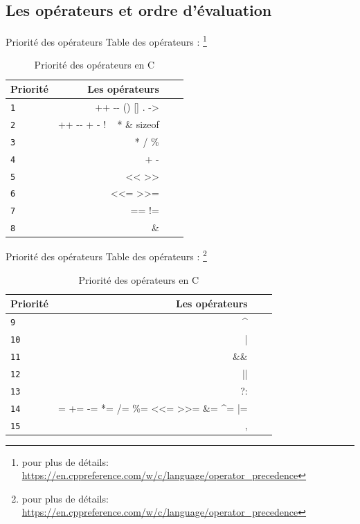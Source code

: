     
    \subsection{Les opérateurs et ordre d'évaluation}
    \begin{frame}{Priorité des opérateurs}
    	Table des opérateurs : \footnote[frame]{pour plus de détails: \url{https://en.cppreference.com/w/c/language/operator_precedence}}
  		\begin{table}[!b]
	  		{\carlitoTLF %
	  		\begin{tabularx}{\textwidth}{Xrrr}
	  			\textbf{Priorité} & \textbf{Les opérateurs} \\
	  			\toprule
	  			\texttt{1} & ++ -{}- () [] . ->    			\\
	  			\texttt{2} & ++ -{}- + - ! ~ * \& sizeof    \\
	  			\texttt{3} & * / \%  						\\
	  			\texttt{4} & + -							\\
	  			\texttt{5} & <{}< >{}>						\\
	  			\texttt{6} & <{}<= >{}>=					\\
	  			\texttt{7} & == !=							\\
	  			\texttt{8} & \&								\\
	  			\bottomrule
	  		\end{tabularx}}
	  		\caption{Priorité des opérateurs en C}
	  	\end{table}  	
  	\end{frame}
  
  	\begin{frame}{Priorité des opérateurs}
  		Table des opérateurs : \footnote[frame]{pour plus de détails: \url{https://en.cppreference.com/w/c/language/operator_precedence}}
  		\begin{table}[!b]
  			{\carlitoTLF %
  				\begin{tabularx}{\textwidth}{Xrrr}
  					\textbf{Priorité} & \textbf{Les opérateurs} \\
  					\toprule
  					\texttt{9} & \textasciicircum		\\
  					\texttt{10} & |						\\
  					\texttt{11} & \&\&					\\
  					\texttt{12} & ||					\\
  					\texttt{13} & ?:					\\
  					\texttt{14} & = += -= *= /= \%=	<{}<= >{}>= \&= \textasciicircum= |= \\
  					\texttt{15} & , \\
  					\bottomrule
  			\end{tabularx}}
  			\caption{Priorité des opérateurs en C}
  		\end{table}  	
  	\end{frame}
  
